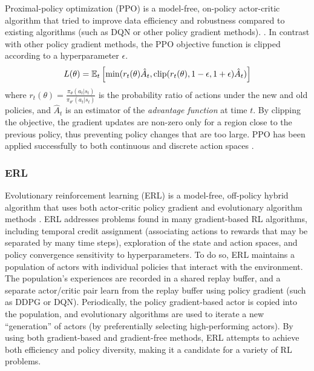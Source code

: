 Proximal-policy optimization (PPO) is a model-free, on-policy actor-critic algorithm that tried to improve data efficiency and robustness compared to existing algorithms (such as DQN or other policy gradient methods).
\cite{schulman2017proximal}.
In contrast with other policy gradient methods, the PPO objective function is clipped according to a hyperparameter $\epsilon$.
\begin{equation}\label{eq:ppo_loss}
    L(\theta) = \mathbb E_t \left[\min(
        r_t(\theta)\hat{A}_t,
        \text{clip}(r_t(\theta), 1-\epsilon, 1+\epsilon) \hat{A}_t
    )\right]
\end{equation}
where
$r_t(\theta) = \frac{\pi_\theta(a_t|s_t)}{\pi_{\theta'}(a_t|s_t)}$ is the probability ratio of actions under the new and old policies, and $\hat{A}_t$ is an estimator of the \emph{advantage function} at time $t$. By clipping the objective, the gradient updates are non-zero only for a region close to the previous policy, thus preventing policy changes that are too large.
PPO has been applied successfully to both continuous and discrete action spaces%
.

\subsubsection{ERL}

Evolutionary reinforcement learning (ERL) is a model-free, off-policy hybrid algorithm that uses both actor-critic policy gradient and evolutionary algorithm methods \cite{khadka2018evolutionguided}. ERL addresses problems found in many  gradient-based RL algorithms, including temporal credit assignment (associating actions to rewards that may be separated by many time steps), exploration of the state and action spaces, and policy convergence sensitivity to hyperparameters. To do so, ERL maintains a population of actors with individual policies that interact with the environment. The population's experiences are recorded in a shared replay buffer, and a separate actor/critic pair learn from the replay buffer using policy gradient (such as DDPG or DQN). Periodically, the policy gradient-based actor is copied into the population, and evolutionary algorithms are used to iterate a new ``generation'' of actors (by preferentially selecting high-performing actors). By using both gradient-based and gradient-free methods, ERL attempts to achieve both efficiency and policy diversity, making it a candidate for a variety of RL problems.

